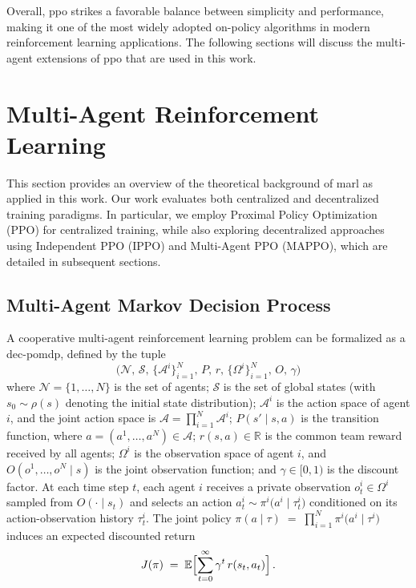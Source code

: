 Overall, \gls{ppo} strikes a favorable balance between simplicity and performance, making it one of the most widely adopted on-policy algorithms in modern reinforcement learning applications. The following sections will discuss the multi-agent extensions of \gls{ppo} that are used in this work.
\section{Multi-Agent Reinforcement Learning}
This section provides an overview of the theoretical background of \gls{marl} as applied in this work. Our work evaluates both centralized and decentralized training paradigms. In particular, we employ Proximal Policy Optimization (PPO) for centralized training, while also exploring decentralized approaches using Independent PPO (IPPO) and Multi-Agent PPO (MAPPO), which are detailed in subsequent sections.
\subsection{Multi-Agent Markov Decision Process}
A cooperative multi-agent reinforcement learning problem can be formalized as a \gls{dec-pomdp}\cite{oliehoek_concise_2016}, defined by the tuple
\[
  \bigl(\mathcal{N},\,\mathcal{S},\,\{\mathcal{A}^i\}_{i=1}^N,\,P,\,r,\,\{\Omega^i\}_{i=1}^N,\,O,\,\gamma\bigr)
\]
where $\mathcal{N}=\{1,\dots,N\}$ is the set of agents; $\mathcal{S}$ is the set of global states (with $s_0\sim\rho(s)$ denoting the initial state distribution); $\mathcal{A}^i$ is the action space of agent $i$, and the joint action space is $\mathcal{A} = \prod_{i=1}^N \mathcal{A}^i$; $P(s' \mid s, a)$ is the transition function, where $a=(a^1,\dots,a^N)\in\mathcal{A}$; $r(s,a)\in\mathbb{R}$ is the common team reward received by all agents; $\Omega^i$ is the observation space of agent $i$, and $O(o^1,\dots,o^N\mid s)$ is the joint observation function; and $\gamma\in[0,1)$ is the discount factor.
At each time step $t$, each agent $i$ receives a private observation $o^i_t \in \Omega^i$ sampled from $O(\cdot\mid s_t)$ and selects an action 
$a^i_t \sim \pi^i\bigl(a^i \mid \tau^i_t\bigr)$
conditioned on its action-observation history $\tau^i_t$. The joint policy 
$\pi(a\mid \tau) \;=\; \prod_{i=1}^N \pi^i\bigl(a^i\mid \tau^i\bigr)$
induces an expected discounted return
\[
  J(\pi) \;=\; \mathbb{E}\Bigl[\sum_{t=0}^\infty \gamma^t\,r(s_t, a_t)\Bigr]\,. 
\]

